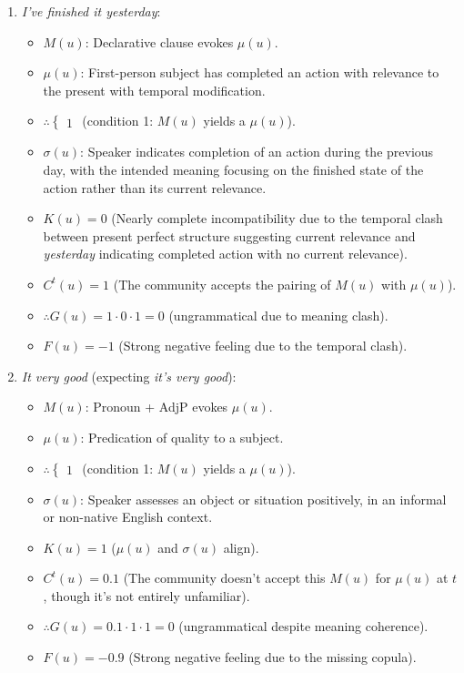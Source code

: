 \documentclass[12pt,letterpaper]{article}
\begin{document}
\begin{enumerate}
    \item \textit{I've finished it yesterday}:
    \begin{itemize}
        \item \(M(u)\): Declarative clause evokes \(\mu(u)\).
        \item \(\mu(u)\): First-person subject has completed an action with relevance to the present with temporal modification.
        \item \(\therefore \begin{cases} 1 \end{cases}\) (condition 1: \(M(u)\) yields a \(\mu(u)\)).
        \item \(\sigma(u)\): Speaker indicates completion of an action during the previous day, with the intended meaning focusing on the finished state of the action rather than its current relevance.
        \item \(K(u) = 0\) (Nearly complete incompatibility due to the temporal clash between present perfect structure suggesting current relevance and \textit{yesterday} indicating completed action with no current relevance).
        \item \(C^t(u) = 1\) (The community accepts the pairing of \(M(u)\) with \(\mu(u)\)).
        \item \(\therefore G(u) = 1 \cdot 0 \cdot 1 = 0\) (ungrammatical due to meaning clash).
        \item \(F(u) = -1\) (Strong negative feeling due to the temporal clash).
    \end{itemize}

    \item \textit{It very good} (expecting \textit{it's very good}):
    \begin{itemize}
        \item \(M(u)\): Pronoun + AdjP evokes \(\mu(u)\).
        \item \(\mu(u)\): Predication of quality to a subject.
        \item \(\therefore \begin{cases} 1 \end{cases}\) (condition 1: \(M(u)\) yields a \(\mu(u)\)).
        \item \(\sigma(u)\): Speaker assesses an object or situation positively, in an informal or non-native English context.
        \item \(K(u) = 1\) (\(\mu(u)\) and \(\sigma(u)\) align).
        \item \(C^t(u) = 0.1\) (The community doesn't accept this \(M(u)\) for \(\mu(u)\) at $t$, though it's not entirely unfamiliar).
        \item \(\therefore G(u) = 0.1 \cdot 1 \cdot 1 = 0\) (ungrammatical despite meaning coherence).
        \item \(F(u) = -0.9\) (Strong negative feeling due to the missing copula).
    \end{itemize}


\end{enumerate}
\end{document}
